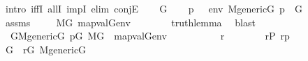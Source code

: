 \begin{isabellebody}
%
\isadelimproof
%
\endisadelimproof
%
\isatagproof
{}\isamarkupfalse%
\ {\isacharparenleft}{\kern0pt}intro\ iffI\ allI\ impI{\isacharcomma}{\kern0pt}\ elim\ conjE{\isacharparenright}{\kern0pt}\isanewline
\ \ \isamarkupfalse%
\ G\isanewline
\ \ \isamarkupfalse%
\ {\isachardoublequoteopen}{\isacharparenleft}{\kern0pt}p\ {\isasymtturnstile}\ {\isasymphi}\ env{\isacharparenright}{\kern0pt}{\isachardoublequoteclose}\ {\isachardoublequoteopen}M{\isacharunderscore}{\kern0pt}generic{\isacharparenleft}{\kern0pt}G{\isacharparenright}{\kern0pt}{\isachardoublequoteclose}\ {\isachardoublequoteopen}p\ {\isasymin}\ G{\isachardoublequoteclose}\isanewline
\ \ \isamarkupfalse%
\ assms\ \isanewline
\ \ \isamarkupfalse%
\ {\isachardoublequoteopen}M{\isacharbrackleft}{\kern0pt}G{\isacharbrackright}{\kern0pt}{\isacharcomma}{\kern0pt}\ map{\isacharparenleft}{\kern0pt}val{\isacharparenleft}{\kern0pt}G{\isacharparenright}{\kern0pt}{\isacharcomma}{\kern0pt}env{\isacharparenright}{\kern0pt}\ {\isasymTurnstile}\ {\isasymphi}{\isachardoublequoteclose}\isanewline
\ \ \ \ \isamarkupfalse%
\ truth{\isacharunderscore}{\kern0pt}lemma\ \isamarkupfalse%
\ blast\isanewline
{}\isamarkupfalse%
\isanewline
\ \ \isamarkupfalse%
\ {}{\isacharcolon}{\kern0pt}\ {\isachardoublequoteopen}{\isasymforall}G{\isachardot}{\kern0pt}{\isacharparenleft}{\kern0pt}M{\isacharunderscore}{\kern0pt}generic{\isacharparenleft}{\kern0pt}G{\isacharparenright}{\kern0pt}{\isasymand}\ p{\isasymin}G{\isacharparenright}{\kern0pt}{\isasymlongrightarrow}\ M{\isacharbrackleft}{\kern0pt}G{\isacharbrackright}{\kern0pt}\ {\isacharcomma}{\kern0pt}\ map{\isacharparenleft}{\kern0pt}val{\isacharparenleft}{\kern0pt}G{\isacharparenright}{\kern0pt}{\isacharcomma}{\kern0pt}env{\isacharparenright}{\kern0pt}\ {\isasymTurnstile}\ {\isasymphi}{\isachardoublequoteclose}\isanewline
\ \ \isacommand{{\isacharbraceleft}{\kern0pt}}\isamarkupfalse%
\isanewline
\ \ \ \ \isamarkupfalse%
\ r\ \isanewline
\ \ \ \ \isamarkupfalse%
\ {}{\isacharcolon}{\kern0pt}\ {\isachardoublequoteopen}r{\isasymin}P{\isachardoublequoteclose}\ {\isachardoublequoteopen}r{\isasympreceq}p{\isachardoublequoteclose}\isanewline
\ \ \ \ \isamarkupfalse%
\ \isanewline
\ \ \ \ \isamarkupfalse%
\ G\ \ {\isachardoublequoteopen}r{\isasymin}G{\isachardoublequoteclose}\ {\isachardoublequoteopen}M{\isacharunderscore}{\kern0pt}generic{\isacharparenleft}{\kern0pt}G{\isacharparenright}{\kern0pt}{\isachardoublequoteclose}\isanewline

\end{isabellebody}
